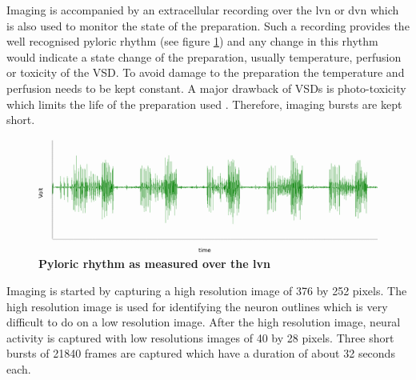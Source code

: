 Imaging is accompanied by an extracellular recording over the \ac{lvn} or \ac{dvn} which is also used to monitor the state of the preparation. Such a recording provides the well recognised pyloric rhythm (see figure \ref{fig:pyloric_rhythm}) and any change in this rhythm would indicate a state change of the preparation, usually temperature, perfusion or toxicity of the \ac{VSD}. To avoid damage to the preparation the temperature and perfusion needs to be kept constant. A major drawback of \acp{VSD} is photo-toxicity which limits the life of the preparation used \cite{Scanziani2009}. Therefore, imaging bursts are kept short. 

\begin{figure}[H]
	\centering
	\includegraphics[width=\columnwidth]{graphics/pyloric_rhythm.png}
	\caption[Pyloric rhythm as measured over the \ac{lvn}]{\textbf{Pyloric rhythm as measured over the \ac{lvn}}} 
	\label{fig:pyloric_rhythm}
\end{figure}

Imaging is started by capturing a high resolution image of 376 by 252 pixels. The high resolution image is used for identifying the neuron outlines which is very difficult to do on a low resolution image. After the high resolution image, neural activity is captured with low resolutions images of 40 by 28 pixels. Three short bursts of 21840 frames are captured which have a duration of about 32 seconds each.


